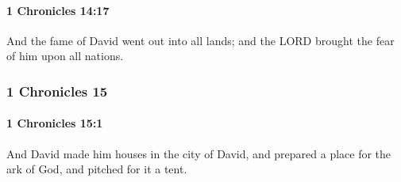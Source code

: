 		\paragraph{1 Chronicles 14:17} %
			\label{1CHRONICLES-14-17}

			And the fame of David went out into all lands; and the LORD brought the fear of him upon all nations.

	\subsubsection{1 Chronicles 15} %
		\label{1CHRONICLES-15}

		\paragraph{1 Chronicles 15:1} %
			\label{1CHRONICLES-15-1}

			And David made him houses in the city of David, and prepared a place for the ark of God, and pitched for it a tent.

